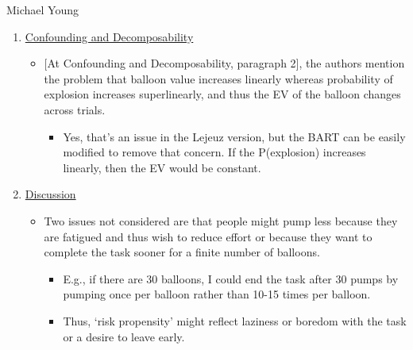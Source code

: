\documentclass[serif, twocolumn, review]{jote-article}
\begin{document}
\begin{reviewend}{Michael Young}
\begin{enumerate}[label=\textbf{\arabic*}), start=0]
    \item \hyperref[sec:confoundingp2]{Confounding and Decomposability}
        \begin{itemize}
            \item $[$At Confounding and Decomposability, paragraph 2$]$, the authors mention the problem that balloon value increases linearly whereas probability of explosion increases superlinearly, and thus the EV of the balloon changes across trials.
            \begin{itemize}
                \item Yes, that's an issue in the Lejeuz version, but the BART can be easily modified to remove that concern.  If the P(explosion) increases linearly, then the EV would be constant.  
            \end{itemize}
        \end{itemize}

    \item \hyperref[sec:discussion]{Discussion}
        \begin{itemize}
            \item Two issues not considered are that people might pump less because they are fatigued and thus wish to reduce effort or because they want to complete the task sooner for a finite number of balloons.
            \begin{itemize}
                \item E.g., if there are 30 balloons, I could end the task after 30 pumps by pumping once per balloon rather than 10-15 times per balloon.
                \item Thus, `risk propensity' might reflect laziness or boredom with the task or a desire to leave early.
            \end{itemize}
        \end{itemize}
    \end{enumerate}
\end{reviewend}
\end{document}
